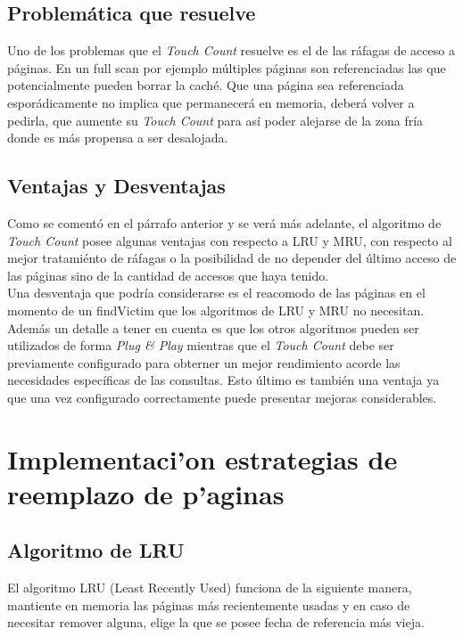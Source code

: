 \documentclass[11pt, a4paper, spanish]{article}
\begin{document}
\subsection{Problem\'atica que resuelve}

Uno de los problemas que el \textit{Touch Count} resuelve es el de las r\'afagas de acceso a p\'aginas. En un full scan por ejemplo m\'ultiples p\'aginas
son referenciadas las que potencialmente pueden borrar la cach\'e. Que una p\'agina sea referenciada espor\'adicamente no implica que permanecer\'a en memoria, deber\'a volver a pedirla, que aumente su \textit{Touch Count} para as\'i poder alejarse de la zona fr\'ia donde es m\'as propensa a ser desalojada.

\newpage
\subsection{Ventajas y Desventajas}

Como se coment\'o en el p\'arrafo anterior y se ver\'a m\'as adelante, el algoritmo de \textit{Touch Count} posee algunas ventajas con respecto a LRU
y MRU, con respecto al mejor tratami\'ento de r\'afagas o la posibilidad de no depender del \'ultimo acceso de las p\'aginas sino de la cantidad de
accesos que haya tenido.\\
 
Una desventaja que podr\'ia considerarse es el reacomodo de las p\'aginas en el momento de un findVictim que los algoritmos de LRU y MRU no necesitan. Adem\'as un detalle a tener en cuenta es que los otros algoritmos pueden ser utilizados de forma \textit{Plug \& Play} mientras que
el \textit{Touch Count} debe ser previamente configurado para obterner un mejor rendimiento acorde las necesidades espec\'ificas de las consultas.
Esto \'ultimo es tambi\'en  una ventaja ya que una vez configurado correctamente puede presentar mejoras considerables.

\newpage 
\section{Implementaci'on estrategias de reemplazo de p'aginas}

\subsection{Algoritmo de LRU}

El algoritmo LRU (Least Recently Used) funciona de la siguiente manera, mantiente en memoria las p\'aginas m\'as recientemente usadas
y en caso de necesitar remover alguna, elige la que se posee fecha de referencia m\'as vieja.\\
\end{document}
